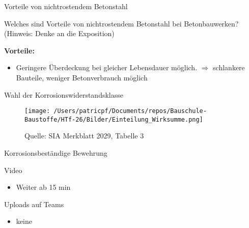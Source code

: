\begin{frame}{Vorteile von nichtrostendem Betonstahl}
\begin{Fragenblock}
    Welches sind Vorteile von nichtrostendem Betonstahl bei Betonbauwerken? (Hinweis: Denke an die Exposition)
\end{Fragenblock}

\pause

\begin{myLösung}
    \textbf{Vorteile:}
    \begin{itemize}
        \item[\faCheckSquare] Geringere Überdeckung bei gleicher Lebensdauer möglich. $\Rightarrow$ schlankere Bauteile, weniger Betonverbrauch möglich
    \end{itemize}
\end{myLösung}
\end{frame}

\begin{frame}{Wahl der Korrosionswiderstandsklasse}

    \begin{figure}[h!bt]
        \centering
        \texttt{[image: /Users/patricpf/Documents/repos/Bauschule-Baustoffe/HTf-26/Bilder/Einteilung\_Wirksumme.png]}
        \caption{Quelle: SIA Merkblatt 2029, Tabelle 3}
    \end{figure}
    
\end{frame}


\begin{frame}{Korrosionsbeständige Bewehrung}
	\begin{block}{Video}
		\begin{itemize}
			\item [\textbullet] Weiter ab 15 min 
		\end{itemize}
	\end{block}
\end{frame}






\begin{frame}{Uploads auf Teams}
	\begin{itemize}
		\item[\textbullet] keine
	\end{itemize}
	        
\end{frame}
    
    
    
    
    

        
    
\folieFragen


